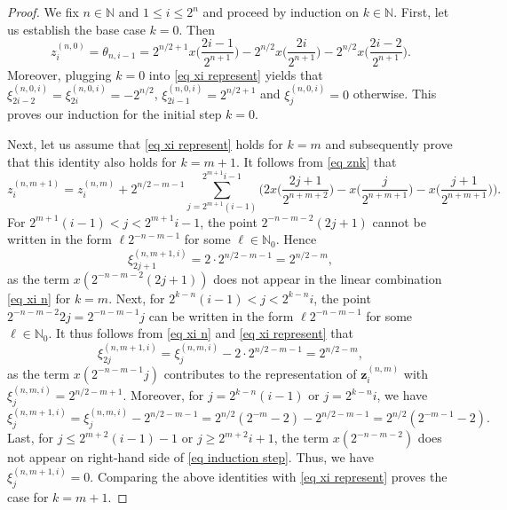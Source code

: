 \documentclass[12pt,reqno]{article}
\numberwithin{equation}{section}
\theoremstyle{definition}
\newcommand{\bN}{\mathbb{N}}
\begin{document}
\begin{proof}
	We fix $n \in \bN$ and $1 \le i \le 2^n$ and proceed by induction on $k \in \bN$. First, let us establish the base case $k = 0$. Then 
	\begin{equation}\label{eq initial step}
		z^{(n,0)}_{i} = \theta_{n,i-1} = 2^{n/2+1}x\Big(\frac{2i-1}{2^{n+1}}\Big) - 2^{n/2} x\Big(\frac{2i}{2^{n+1}}\Big)-2^{n/2}x\Big(\frac{2i-2}{2^{n+1}}\Big).
	\end{equation}
	Moreover, plugging $k = 0$ into \eqref{eq xi represent} yields that $\xi_{2i-2}^{(n,0,i)} = \xi_{2i}^{(n,0,i)} = -2^{n/2}$, $\xi_{2i-1}^{(n,0,i)} = 2^{n/2+1}$ and $\xi_{j}^{(n,0,i)} = 0$ otherwise. This proves our induction for the initial step $k = 0$. 
	
	Next, let us assume that \eqref{eq xi represent} holds for $k = m$ and subsequently prove that this identity also holds for $k = m + 1$. It follows from \eqref{eq znk} that
	\begin{equation}\label{eq induction step}
		z^{(n,m+1)}_{i} = z^{(n,m)}_{i} + 2^{n/2-m - 1}\sum_{j = 2^{m+1}(i-1)}^{2^{m + 1}i-1}\bigg(2x\Big(\frac{2j+1}{2^{n+m +2}}\Big)-x\Big(\frac{j}{2^{n+m +1}}\Big)-x\Big(\frac{j+1}{2^{n+m +1}}\Big)\bigg).
	\end{equation}
	For $2^{m + 1}(i-1) < j < 2^{m + 1}i-1$, the point $2^{-n-m-2}(2j+1)$ cannot be written in the form $\ell2^{-n-m-1}$ for some $\ell\in \bN_0$. Hence 
	$$
	\xi_{2j+1}^{(n,m+1,i)} = 2\cdot 2^{n/2-m-1} = 2^{n/2-m},
	$$
	as the term $x(2^{-n-m-2}(2j+1))$ does not appear in the linear combination \eqref{eq xi n} for $k = m$. Next, for $2^{k-n}(i-1) < j < 2^{k-n}i$, the point $2^{-n-m-2}2j = 2^{-n-m-1}j $ can be written in the form $\ell2^{-n-m-1}$ for some $\ell\in \bN_0$. It thus follows from \eqref{eq xi n} and \eqref{eq xi represent} that
	$$
	\xi^{(n,m+1,i)}_{2j} = \xi^{(n,m,i)}_{j} - 2 \cdot 2^{n/2-m-1} =  2^{n/2-m},$$
	as the term $x(2^{-n-m-1}j)$ contributes to the representation of $\bm z^{(n,m)}_i$ with $\xi^{(n,m,i)}_{j} = 2^{n/2-m+1}$. Moreover, for $j = 2^{k-n}(i-1)$ or $j = 2^{k-n}i$, we have 
	\begin{equation*}
		\xi_{j}^{(n,m+1,i)} = \xi_{j}^{(n,m,i)} - 2^{n/2-m-1} = 2^{n/2}(2^{-m}-2) - 2^{n/2-m-1} = 2^{n/2}(2^{-m-1}-2).
	\end{equation*}
	Last, for $j \le 2^{m+2}(i-1)-1$ or $j \ge 2^{m+2}i + 1$, the term $x(2^{-n-m-2})$ does not appear on right-hand side of \eqref{eq induction step}. Thus, we have $\xi_{j}^{(n,m+1,i)} = 0$. Comparing the above identities with \eqref{eq xi represent} proves the case for $k = m+1$.
\end{proof}
\end{document}
